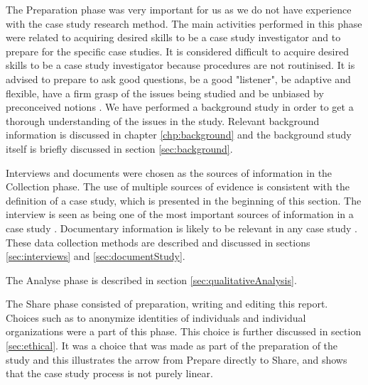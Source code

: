 The Preparation phase was very important for us as we do not have experience with the case study research method. The main activities performed in this phase were related to acquiring desired skills to be a case study investigator and to prepare for the specific case studies. It is considered difficult to acquire desired skills to be a case study investigator because procedures are not routinised. It is advised to prepare to ask good questions, be a good "listener", be adaptive and flexible, have a firm grasp of the issues being studied and be unbiased by preconceived notions \cite{CaseStudyResearch}. We have performed a background study in order to get a thorough understanding of the issues in the study. Relevant background information is discussed in chapter \ref{chp:background} and the background study itself is briefly discussed in section \ref{sec:background}. %

Interviews and documents were chosen as the sources of information in the Collection phase. The use of multiple sources of evidence is consistent with the definition of a case study, which is presented in the beginning of this section. The interview is seen as being one of the most important sources of information in a case study \cite{CaseStudyResearch}. Documentary information is likely to be relevant in any case study \cite{CaseStudyResearch}. These data collection methods are described and discussed in sections \ref{sec:interviews} and \ref{sec:documentStudy}.

The Analyse phase is described in section \ref{sec:qualitativeAnalysis}.

The Share phase consisted of preparation, writing and editing this report. Choices such as to anonymize identities of individuals and individual organizations were a part of this phase. This choice is further discussed in section \ref{sec:ethical}. It was a choice that was made as part of the preparation of the study and this illustrates the arrow from Prepare directly to Share, and shows that the case study process is not purely linear. 